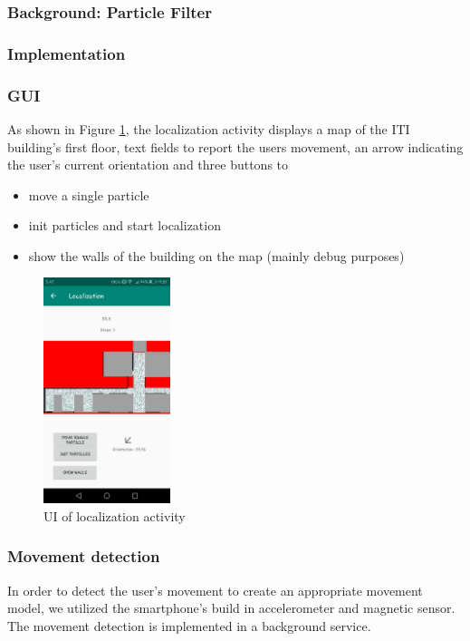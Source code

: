 \documentclass[12pt]{article}
\begin{document}
\subsubsection{Background: Particle Filter}





\subsubsection{Implementation}
\subsubsection*{GUI}
As shown in Figure \ref{fig:localization}, the localization activity displays a map of the ITI building's first floor, text fields to report the users movement, an arrow indicating the user's current orientation and three buttons to 
\begin{itemize}[noitemsep,topsep=0pt]
	\item move a single particle
	\item init particles and start localization
	\item show the walls of the building on the map (mainly debug purposes)
\end{itemize}

\begin{figure}
	\centering
	\includegraphics[width=140px]{images/localization.jpeg}
	\caption{UI of localization activity}
	\label{fig:localization}
\end{figure}

\subsubsection*{Movement detection}
In order to detect the user's movement to create an appropriate movement model, we utilized the smartphone's build in accelerometer and magnetic sensor. The movement detection is implemented in a background service.
\end{document}
